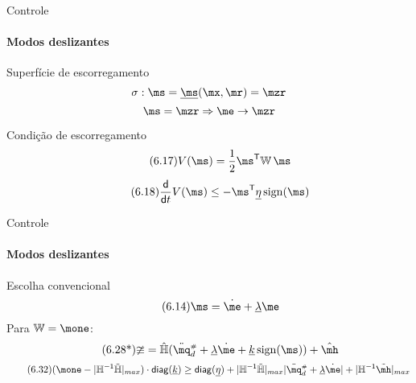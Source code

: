 \documentclass[25pt,landscape]{beamer}
\begin{document}
\begin{frame}{Controle}
    \framesubtitle{Modos deslizantes}
    \begin{block}{Superfície de escorregamento}
    	\begin{equation*} 
			\sigma: \ms = \underline{\ms}(\mx, \mr) = \mzr
		\end{equation*} %
		\begin{equation*}
			\ms = \mzr \Rightarrow \me \rightarrow \mzr
		\end{equation*}
    \end{block}
    \begin{block}{Condição de escorregamento}
		\begin{equation} \tag{6.17}
			V(\ms) = \frac{1}{2} \ms^\msT \mW \, \ms
		\end{equation}
		\begin{equation} \label{eq:SlidingCondition} \tag{6.18}
			\frac{\dd}{\dd t} V(\ms)  \leq -   \ms^\msT \underline{\eta} \sign(\ms) 
		\end{equation}
    \end{block}
\end{frame}

\begin{frame}{Controle}
    \framesubtitle{Modos deslizantes}
    \begin{block}{Escolha convencional}
    	\begin{equation} \tag{6.14} 
			\ms = \dot{\me} + \underline{\lambda} \me
		\end{equation} 
		Para $\mW = \mone$:
		\begin{equation} \tag{6.28*}
			\mup = \hat{\mH}(\ddot{\mq}\ssh_d + \underline{\lambda} \dot{\me} + \underline{k} \sign(\ms) ) + \hat{\mh}
		\end{equation}
		\begin{equation} \label{eq:DesigualdadeK2_a1} \tag{6.32}
			(\mone - | \mH^\msI \tilde{\mH}|_{max} ) \cdot \diag(\underline{k})  \geq \diag(\underline{\eta}) + |\mH^\msI \tilde{\mH}|_{max} |\ddot{\mq}\ssh_d + \underline{\lambda} \dot{\me}| + |\mH^\msI\tilde{\mh}|_{max}
		\end{equation}
	$$ $$	
    \end{block}
\end{frame}
\end{document}
